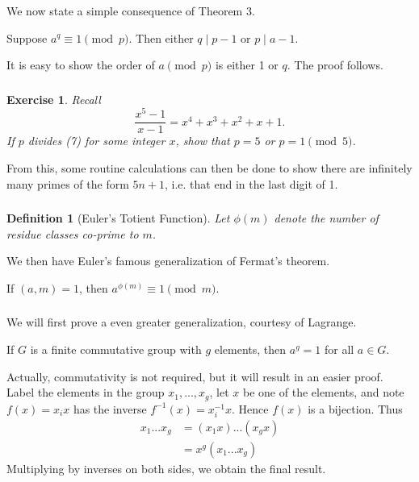\documentclass{article}
\newtheorem{exercise}{Exercise}
\newtheorem{defn}{Definition}
\begin{document}
\subsubsection{}
We now state a simple consequence of Theorem 3.
\begin{thm}
    Suppose $a^{q} \equiv 1 \pmod{p}$. Then either $q \mid p-1$ or $p \mid a-1$.
\end{thm}
It is easy to show the order of $a \pmod{p}$ is either 1 or $q$. The proof follows.

\subsubsection{}
\begin{exercise}
    Recall
    \begin{equation}
        \frac{x^{5}-1}{x-1} = x^{4} + x^{3} + x^{2} + x + 1.
    \end{equation}
    If $p$ divides (7) for some integer $x$, show that $p = 5$ or $p = 1 \pmod{5}$.
\end{exercise}
From this, some routine calculations can then be done to show there are infinitely many primes of the form $5n+1$, i.e. that end in the last digit of 1.

\subsubsection{}
\begin{defn}[Euler's Totient Function]
    Let $\phi(m)$ denote the number of residue classes co-prime to $m$.
\end{defn}
We then have Euler's famous generalization of Fermat's theorem.
\begin{thm}
    If $(a,m) = 1$, then $a^{\phi(m)} \equiv 1 \pmod{m}$. 
\end{thm}

\subsubsection{}
We will first prove a even greater generalization, courtesy of Lagrange.
\begin{thm}
    If $G$ is a finite commutative group with $g$ elements, then $a^{g} = 1$ for all $a \in G$.
\end{thm}
Actually, commutativity is not required, but it will result in an easier proof. Label the elements in the group $x_{1},...,x_{g}$, let $x$ be one of the elements, and note $f(x) = x_{i}x$ has the inverse $f^{-1}(x) = x_{i}^{-1}x$. Hence $f(x)$ is a bijection. Thus
\begin{equation}
\begin{split}
    x_{1}...x_{g} &= (x_{1}x)...(x_{g}x) \\
    &= x^{g}(x_{1}...x_{g})
\end{split}
\end{equation}
Multiplying by inverses on both sides, we obtain the final result.
\end{document}
